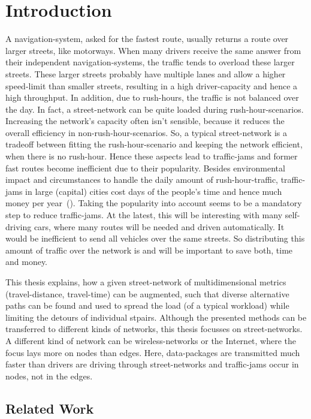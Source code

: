 \chapter{Introduction}
\label{chap:introduction}

A navigation-system, asked for the fastest route, usually returns a route over larger streets, like motorways.
When many drivers receive the same answer from their independent navigation-systems, the traffic tends to overload these larger streets.
These larger streets probably have multiple lanes and allow a higher speed-limit than smaller streets, resulting in a high driver-capacity and hence a high throughput.
In addition, due to rush-hours, the traffic is not balanced over the day.
In fact, a street-network can be quite loaded during rush-hour-scenarios.
Increasing the network's capacity often isn't sensible, because it reduces the overall efficiency in non-rush-hour-scenarios.
So, a typical street-network is a tradeoff between fitting the rush-hour-scenario and keeping the network efficient, when there is no rush-hour.
Hence these aspects lead to traffic-jams and former fast routes become inefficient due to their popularity.
Besides environmental impact and circumstances to handle the daily amount of rush-hour-traffic, traffic-jams in large (capital) cities cost days of the people's time and hence much money per year~(\cite{inrix:traffic-cost}).
Taking the popularity into account seems to be a mandatory step to reduce traffic-jams.
At the latest, this will be interesting with many self-driving cars, where many routes will be needed and driven automatically.
It would be inefficient to send all vehicles over the same streets.
So distributing this amount of traffic over the network is and will be important to save both, time and money.

This thesis explains, how a given street-network of multidimensional metrics (travel-distance, travel-time) can be augmented, such that diverse alternative paths can be found and used to spread the load (of a typical workload) while limiting the detours of individual \glspl{stpair}.
Although the presented methods can be transferred to different kinds of networks, this thesis focusses on street-networks.
A different kind of network can be wireless-networks or the Internet, where the focus lays more on nodes than edges.
Here, data-packages are transmitted much faster than drivers are driving through street-networks and traffic-jams occur in nodes, not in the edges.

\section{Related Work}


